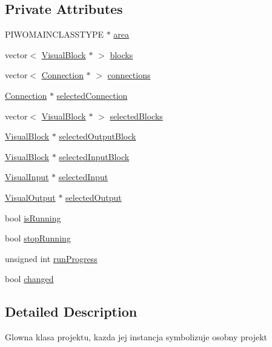 \subsection*{Private Attributes}
\begin{CompactItemize}
\item 
PIWOMAINCLASSTYPE $\ast$ \hyperlink{classPIWOEngine_d5da32bb11409879f33eca9ebddfc9d6}{area}
\item 
vector$<$ \hyperlink{classVisualBlock}{VisualBlock} $\ast$ $>$ \hyperlink{classPIWOEngine_8cc6b573d0eacacc5043891a36b6e820}{blocks}
\item 
vector$<$ \hyperlink{classConnection}{Connection} $\ast$ $>$ \hyperlink{classPIWOEngine_192e9886f89d0eee49173cc199afe561}{connections}
\item 
\hyperlink{classConnection}{Connection} $\ast$ \hyperlink{classPIWOEngine_89b3e231d010fe4a3672704b68e9fcea}{selectedConnection}
\item 
vector$<$ \hyperlink{classVisualBlock}{VisualBlock} $\ast$ $>$ \hyperlink{classPIWOEngine_c2cf186bc174d18bc9764b534bb5879d}{selectedBlocks}
\item 
\hyperlink{classVisualBlock}{VisualBlock} $\ast$ \hyperlink{classPIWOEngine_573250b25797190affc38e1e3fdf8bf3}{selectedOutputBlock}
\item 
\hyperlink{classVisualBlock}{VisualBlock} $\ast$ \hyperlink{classPIWOEngine_9fe3dcb62ef1ef7860afe06ddca01585}{selectedInputBlock}
\item 
\hyperlink{classVisualInput}{VisualInput} $\ast$ \hyperlink{classPIWOEngine_87ae251a3b1c318e8c26e85396fde9e9}{selectedInput}
\item 
\hyperlink{classVisualOutput}{VisualOutput} $\ast$ \hyperlink{classPIWOEngine_3008a57c7914a602b34bf470a90d2bb6}{selectedOutput}
\item 
bool \hyperlink{classPIWOEngine_58d8519fdc284ac5b088d4b9ead41de1}{isRunning}
\item 
bool \hyperlink{classPIWOEngine_fb15e05147a0a299649307876eb97412}{stopRunning}
\item 
unsigned int \hyperlink{classPIWOEngine_84d4db25d471839e7cdd44ae0eb2b517}{runProgress}
\item 
bool \hyperlink{classPIWOEngine_3d5702db522458d8de52d3dbd0203cdc}{changed}
\end{CompactItemize}


\subsection{Detailed Description}
Glowna klasa projektu, kazda jej instancja symbolizuje osobny projekt 

